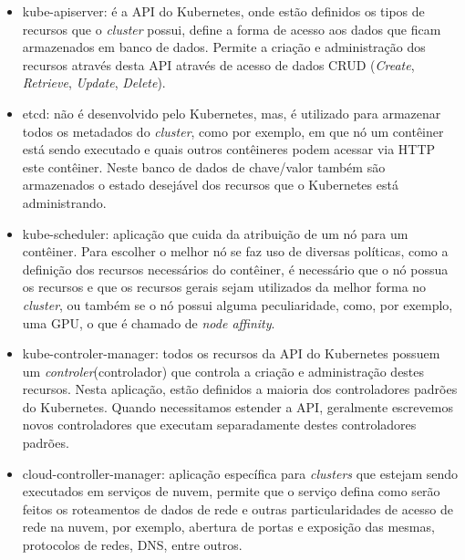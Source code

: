 \begin{itemize}
    \item kube-apiserver: é a API do Kubernetes, onde estão definidos os tipos
    de recursos que o \textit{cluster} possui, define a forma de acesso aos
    dados que ficam armazenados em banco de dados. Permite a criação e administração
    dos recursos através desta API através de acesso de dados CRUD (\textit{Create},
    \textit{Retrieve}, \textit{Update}, \textit{Delete}).
    \item etcd: não é desenvolvido pelo Kubernetes, mas, é utilizado para armazenar
    todos os metadados do \textit{cluster}, como por exemplo, em que nó um
    contêiner está sendo executado e quais outros contêineres podem acessar via
    HTTP este contêiner. Neste banco de dados de chave/valor também são armazenados
    o estado desejável dos recursos que o Kubernetes está administrando.
    \item kube-scheduler: aplicação que cuida da atribuição de um nó para um contêiner.
    Para escolher o melhor nó se faz uso de diversas políticas, como a definição dos
    recursos necessários do contêiner, é necessário que o nó possua os recursos e
    que os recursos gerais sejam utilizados da melhor forma no \textit{cluster},
    ou também se o nó possui alguma peculiaridade, como, por exemplo, uma GPU, o
    que é chamado de \textit{node affinity}.
    \item kube-controler-manager: todos os recursos da API do Kubernetes possuem
    um \textit{controler}(controlador) que controla a criação e administração
    destes recursos. Nesta aplicação, estão definidos a maioria dos controladores
    padrões do Kubernetes. Quando necessitamos estender a API, geralmente escrevemos
    novos controladores que executam separadamente destes controladores padrões.
    \item cloud-controller-manager: aplicação específica para \textit{clusters}
    que estejam sendo executados em serviços de nuvem, permite que o serviço defina
    como serão feitos os roteamentos de dados de rede e outras particularidades de
    acesso de rede na nuvem, por exemplo, abertura de portas e exposição das mesmas,
    protocolos de redes, DNS, entre outros.
\end{itemize}

